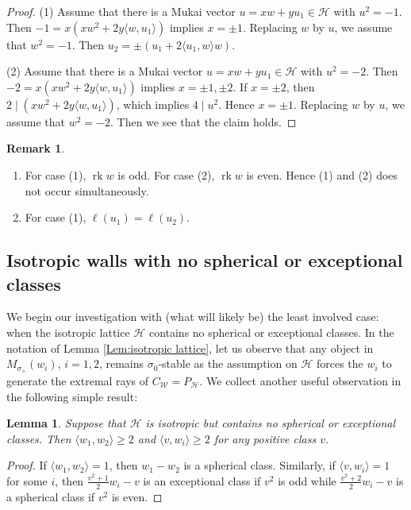 \documentclass[leqno,11pt]{amsart}
\def\rk{\mathop{\mathrm{rk}}}
\newtheorem{Lem}[Thm]{Lemma}
\theoremstyle{definition}
\newtheorem{Rem}[Thm]{Remark}
\def\HH{\ensuremath{\mathcal H}}
\def\WW{\ensuremath{\mathcal W}}
\begin{document}
\begin{proof}
(1)
Assume that there is a Mukai vector $u=x w+yu_1 \in \HH$ with $u^2=-1$.
Then
$-1=x(x w^2+2y \langle w,u_1 \rangle)$ implies
$x=\pm 1$.  Replacing $w$ by $u$, we assume that $w^2=-1$.
Then $u_2=\pm(u_1+2 \langle u_1,w \rangle w)$.


(2) 
Assume that there is a Mukai vector $u=x w+yu_1 \in \HH$ with $u^2=-2$.
Then 
$-2=x(x w^2+2y \langle w,u_1 \rangle)$ implies
$x=\pm 1,\pm 2$.  
If $x=\pm 2$, then $2 \mid (x w^2+2y \langle w,u_1 \rangle)$,
which implies $4 \mid u^2$.
Hence $x=\pm 1$.
Replacing $w$ by $u$, we assume that $w^2=-2$.
Then we see that the claim holds.
\end{proof}

\begin{Rem}
\begin{enumerate}
\item
For case (1), $\rk w$ is odd. For case (2), $\rk w$ is even.
Hence (1) and (2) does not occur simultaneously.
\item
For case (1), $\ell(u_1)=\ell(u_2)$.
\end{enumerate}
\end{Rem}

\subsection{Isotropic walls with no spherical or exceptional classes}

We begin our investigation with (what will likely be) the least involved case: when the isotropic lattice $\HH$ contains no spherical or exceptional classes.  In the notation of Lemma \ref{Lem:isotropic lattice}, let us observe that any object in $M_{\sigma_+}(w_i)$, $i=1,2$, remains $\sigma_0$-stable as the assumption on $\HH$ forces the $w_i$ to generate the extremal rays of $C_{\WW}=P_{\HH}$.  We collect another useful observation in the following simple result:
\begin{Lem}\label{Lem:product bigger than 1}
Suppose that $\HH$ is isotropic but contains no spherical or exceptional classes.  Then $\langle w_1,w_2\rangle\geq 2$ and $\langle v,w_i\rangle\geq 2$ for any positive class $v$.
\end{Lem}
\begin{proof}
If $\langle w_1,w_2\rangle=1$, then $w_1-w_2$ is a spherical class.  Similarly, if $\langle v,w_i\rangle=1$ for some $i$, then $\frac{v^2+1}{2}w_i-v$ is an exceptional class if $v^2$ is odd while $\frac{v^2+2}{2}w_i-v$ is a spherical class if $v^2$ is even.  
\end{proof}
\end{document}
